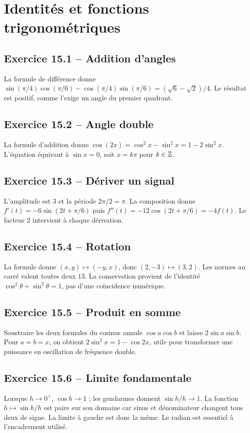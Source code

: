 \chapter{Identités et fonctions trigonométriques}
\section*{Exercice 15.1 -- Addition d'angles}
La formule de différence donne $\sin(\pi/4)\cos(\pi/6)-\cos(\pi/4)\sin(\pi/6)=(\sqrt6-\sqrt2)/4$. Le résultat est positif, comme l'exige un angle du premier quadrant.

\section*{Exercice 15.2 -- Angle double}
La formule d'addition donne $\cos(2x)=\cos^2x-\sin^2x=1-2\sin^2x$. L'équation équivaut à $\sin x=0$, soit $x=k\pi$ pour $k\in\mathbb{Z}$.

\section*{Exercice 15.3 -- Dériver un signal}
L'amplitude est $3$ et la période $2\pi/2=\pi$. La composition donne $f'(t)=-6\sin(2t+\pi/6)$ puis $f''(t)=-12\cos(2t+\pi/6)=-4f(t)$. Le facteur $2$ intervient à chaque dérivation.

\section*{Exercice 15.4 -- Rotation}
La formule donne $(x,y)\mapsto(-y,x)$, donc $(2,-3)\mapsto(3,2)$. Les normes au carré valent toutes deux $13$. La conservation provient de l'identité $\cos^2\theta+\sin^2\theta=1$, pas d'une coïncidence numérique.

\section*{Exercice 15.5 -- Produit en somme}
Soustraire les deux formules du cosinus annule $\cos a\cos b$ et laisse $2\sin a\sin b$. Pour $a=b=x$, on obtient $2\sin^2x=1-\cos2x$, utile pour transformer une puissance en oscillation de fréquence double.

\section*{Exercice 15.6 -- Limite fondamentale}
Lorsque $h\to0^+$, $\cos h\to1$ ; les gendarmes donnent $\sin h/h\to1$. La fonction $h\mapsto\sin h/h$ est paire sur son domaine car sinus et dénominateur changent tous deux de signe. La limite à gauche est donc la même. Le radian est essentiel à l'encadrement utilisé.
